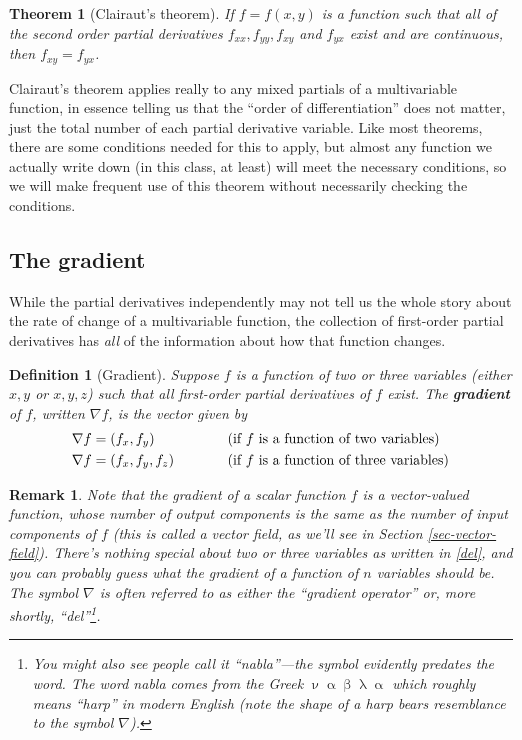 \documentclass[12pt]{article}
\numberwithin{equation}{subsection}
\numberwithin{figure}{subsection}
\newtheorem{thm}[subsection]{Theorem}
\newtheorem{defn}[subsection]{Definition}
\theoremstyle{note}
\newtheorem{remark}[subsection]{Remark}
\begin{document}
{\begin{thm}[Clairaut's theorem]  \label{Clairut-thm} If $f=f(x,y)$ is a function such that all of the second order partial derivatives $f_{xx}, f_{yy}, f_{xy}$ and $f_{yx}$ exist and are continuous, then $f_{xy}=f_{yx}$.
\end{thm}

Clairaut's theorem applies really to any mixed partials of a multivariable function, in essence telling us that the ``order of differentiation'' does not matter, just the total number of each partial derivative variable. Like most theorems, there are some conditions needed for this to apply, but almost any function we actually write down (in this class, at least) will meet the necessary conditions, so we will make frequent use of this theorem without necessarily checking the conditions.


\subsection{The gradient}

While the partial derivatives independently may not tell us the whole story about the rate of change of a multivariable function, the collection of first-order partial derivatives has \textit{all} of the information about how that function changes. 

\begin{defn}[Gradient] Suppose $f$ is a function of two or three variables (either $x,y$ or $x,y,z$) such that all first-order partial derivatives of $f$ exist. The \textbf{gradient} of $f$, written $\nabla f$, is the \textit{vector} given by \begin{align}  \label{del}
	&\nabla f =(f_x,f_y) & \hspace{10mm} & (\text{if $f$ is a function of two variables})  \nonumber \\
	&\nabla f =(f_x,f_y,f_z) & & (\text{if $f$ is a function of three variables}) 
\end{align}
\end{defn}

\begin{remark}Note that the gradient of a scalar function $f$ is a vector-valued function, whose number of output components is the same as the number of input components of $f$ (this is called a vector field, as we'll see in Section \ref{sec-vector-field}). There's nothing special about two or three variables as written in \eqref{del}, and you can probably guess what the gradient of a function of $n$ variables should be. The symbol $\nabla$ is often referred to as either the ``gradient operator'' or, more shortly, ``del''\footnote{You might also see people call it ``nabla''---the symbol evidently predates the word. The word \textit{nabla} comes from the Greek $\upnu \upalpha \upbeta \uplambda \upalpha$ which roughly means ``harp'' in modern English (note the shape of a harp bears resemblance to the symbol $\nabla$).}.\end{remark}

}
\end{document}
